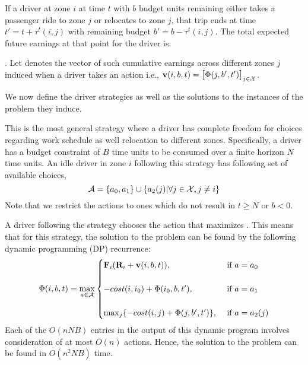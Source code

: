 If a driver at zone $i$ at time $t$ with $b$ budget units remaining either takes a passenger ride to zone $j$
or relocates to zone $j$, that trip ends at time 
$t' = t + \tau^t(i,j)$ with remaining budget $b' = b - \tau^t(i,j)$. The 
total expected future earnings at that point for the driver 
is: {. 
Let {} denotes the vector of such
cumulative earnings across different zones $j$ induced when a driver takes an  {\getpassengeraction} 
action i.e., $\mathbf{v}({i},{b,t}) = \big[\Phi({j,b',t'})\big]_{j \in \mathcal{X}}$.

We now define the driver strategies as well as the
solutions to the instances of the {\originalproblem} problem they induce.


This is the most general strategy where a driver has complete freedom for choices regarding work schedule as well relocation to different zones. Specifically, a driver has a budget constraint of $B$ time units to be consumed over a finite horizon $N$ time units. An idle driver in zone $i$ following this strategy has following set of available choices,
\begin{equation}
\mathcal{A} =  \{a_0, a_1\} \cup \{a_2(j) | \forall j \in \mathcal{X}, j \neq i \}
\end{equation}
Note that we restrict the {\relocate} actions to ones which do not result in $t \geq N$ or $b < 0$.

A driver following the {\relocationflexible} strategy chooses the action that maximizes {\totalexpectedearnings}. This means that for this strategy, the solution to
the {\originalproblem} problem can be found by the following dynamic programming (DP)
recurrence:
\begin{eqnarray}
\label{eq:relocationflexible_strategy}
\Phi({i,b,t}) = \max_{a \in \mathcal{A}}
    \begin{cases}
    {\ensuremath{\mathbf{F}}}_{i} ({\mathbf{R}}_{i} +  \mathbf{v}({i},{b,t})), &\textrm{  if } a = a_0\\ \\
    -cost(i,{i_0}) + \Phi({{i_0},b,t'}), &\textrm{  if } a = a_1 \\ \\
    \max_{j} \{-cost(i,j) + \Phi({j,b',t'})\}, &\textrm{  if } a = a_2(j)
    \end{cases}
\end{eqnarray}
Each of the $O(n N B)$ entries in the output of this dynamic program involves consideration of at most $O(n)$ actions. 
Hence, the solution to the {\originalproblem} problem can be found in $O(n^2 N B)$ time.

}
